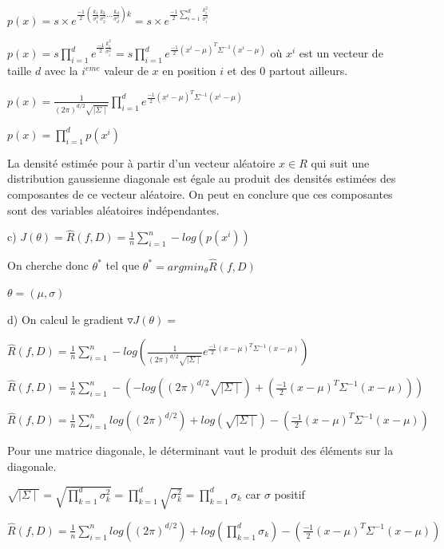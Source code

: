 \documentclass[a4paper,10pt]{article}
\begin{document}
$p(x) = s \times e^{\frac{-1}{2} (\frac{k_{1}}{\sigma_{1}^{2}} \frac{k_{2}}{\sigma_{2}^{2}} ... \frac{k_{d}}{\sigma_{d}^{2}} )k }  = s \times e^{\frac{-1}{2} \sum_{i=1}^{d} \frac{k_{i}^{2} }{\sigma_{i}^{2}} }$

$p(x) = s \prod_{i=1}^{d} e^{\frac{-1}{2} \frac{k_{i}^{2} }{\sigma_{i}^{2}} }  = s \prod_{i=1}^{d} e^{\frac{-1}{2} (x^{i} - \mu)^{T} \Sigma^{-1} (x^{i} - \mu) } $ où $x^{i}$ est un vecteur de taille $d$ avec la $i^{eme}$ valeur de $x$ en position $i$ et des 0 partout ailleurs.

$p(x) =\frac{1}{(2 \pi)^{d/2} \sqrt{\mid{\Sigma} \mid}} \prod_{i=1}^{d} e^{\frac{-1}{2} (x^{i} - \mu)^{T} \Sigma^{-1} (x^{i} - \mu) }  $

$p(x) = \prod_{i=1}^{d} p(x^{i}) $


La densité estimée pour à partir d'un vecteur aléatoire $x \in R$ qui suit une distribution gaussienne diagonale est égale au produit des densités estimées des composantes de ce vecteur aléatoire. On peut en conclure que ces composantes sont des variables aléatoires indépendantes.


c) $ J(\theta) =\widehat{R}(f,D) = \frac{1}{n} \sum_{i=1}^{n} -log (p(x^{i}))$

On cherche donc $\theta^{*}$ tel que $\theta^{*} = argmin_{\theta} \widehat{R}(f,D)$

$ \theta = ( \mu, \sigma )$

d) On calcul le gradient $ \triangledown J(\theta) = $

$\widehat{R}(f,D) = \frac{1}{n} \sum_{i=1}^{n} -log (\frac{1}{(2 \pi)^{d/2} \sqrt{\mid{\Sigma} \mid}} e^{\frac{-1}{2} (x- \mu)^{T} \Sigma^{-1} (x- \mu) })$

$ \widehat{R}(f,D) = \frac{1}{n} \sum_{i=1}^{n} - ( -log((2 \pi)^{d/2} \sqrt{\mid{\Sigma} \mid} ) + (\frac{-1}{2} (x- \mu)^{T} \Sigma^{-1} (x- \mu) ) )$

$ \widehat{R}(f,D) = \frac{1}{n} \sum_{i=1}^{n} log((2 \pi)^{d/2} )+log(\sqrt{\mid{\Sigma} \mid} ) - (\frac{-1}{2} (x- \mu)^{T} \Sigma^{-1} (x- \mu) ) $

Pour une matrice diagonale, le déterminant vaut le produit des éléments sur la diagonale.

$\sqrt{\mid{\Sigma} \mid} = \sqrt{ \prod_{k=1}^{d} \sigma^{2}_{k} } =   \prod_{k=1}^{d} \sqrt{\sigma^{2}_{k} } = \prod_{k=1}^{d} \sigma_{k} $ car $\sigma$ positif

$ \widehat{R}(f,D) = \frac{1}{n} \sum_{i=1}^{n} log((2 \pi)^{d/2} )+log(\prod_{k=1}^{d} \sigma_{k} ) - (\frac{-1}{2} (x- \mu)^{T} \Sigma^{-1} (x- \mu) ) $
\end{document}
